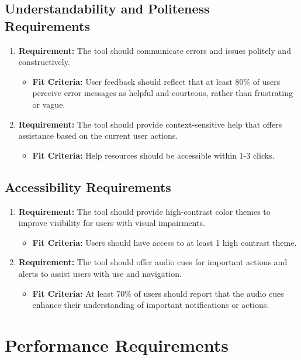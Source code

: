 \documentclass[12pt]{article}
\begin{document}
\subsection{Understandability and Politeness Requirements}
\begin{enumerate}
  \item \textbf{Requirement:} The tool should communicate errors and issues politely and constructively.
  \begin{itemize}[label={}]
      \item \textbf{Fit Criteria:} User feedback should reflect that at least 80\% of users perceive error messages as helpful and courteous, rather than frustrating or vague.
  \end{itemize}
  \item \textbf{Requirement:} The tool should provide context-sensitive help that offers assistance based on the current user actions.
  \begin{itemize}[label={}]
      \item \textbf{Fit Criteria:} Help resources should be accessible within 1-3 clicks.
  \end{itemize}
\end{enumerate}
\subsection{Accessibility Requirements}
\begin{enumerate}
  \item \textbf{Requirement:} The tool should provide high-contrast color themes to improve visibility for users with visual impairments.
  \begin{itemize}[label={}]
      \item \textbf{Fit Criteria:} Users should have access to at least 1 high contrast theme.
  \end{itemize}
  \item \textbf{Requirement:} The tool should offer audio cues for important actions and alerts to assist users with use and navigation.
  \begin{itemize}[label={}]
      \item \textbf{Fit Criteria:} At least 70\% of users should report that the audio cues enhance their understanding of important notifications or actions.
  \end{itemize}
\end{enumerate}

\section{Performance Requirements}
\end{document}
